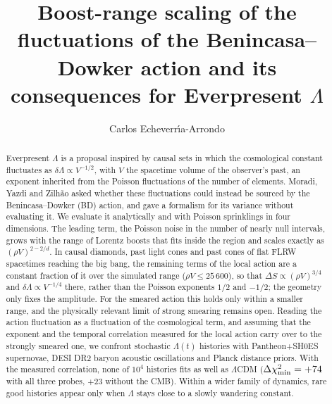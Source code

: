 \documentclass{iopjournal}
\newcommand{\rhoV}{\rho V}
\renewcommand{\articletype}[1]{\noindent{\scriptsize\sf\bfseries\MakeUppercase{#1}}\par\vspace{4mm}}
\begin{document}
\articletype{Paper}

\title{Boost-range scaling of the fluctuations of the Benincasa--Dowker action and its consequences for Everpresent $\Lambda$}

\author{Carlos Echeverr\'{\i}a-Arrondo}




\begin{abstract}
Everpresent $\Lambda$ is a proposal inspired by causal sets in which the
cosmological constant fluctuates as $\delta\Lambda\propto V^{-1/2}$, with $V$
the spacetime volume of the observer's past, an exponent inherited from the
Poisson fluctuations of the number of elements. Moradi, Yazdi and Zilh\~ao
asked whether these fluctuations could instead be sourced by the
Benincasa--Dowker (BD) action, and gave a formalism for its variance without
evaluating it. We evaluate it analytically and with Poisson sprinklings in
four dimensions. The leading term, the Poisson noise in the number of nearly
null intervals, grows with the range of Lorentz boosts that fits inside the
region and scales exactly as $(\rhoV)^{2-2/d}$. In causal diamonds, past
light cones and past cones of flat FLRW spacetimes reaching the big bang, the
remaining terms of the local action are a constant fraction of it over the
simulated range ($\rhoV\le25\,600$), so that $\Delta S\propto(\rhoV)^{3/4}$
and $\delta\Lambda\propto V^{-1/4}$ there, rather than the Poisson exponents
$1/2$ and $-1/2$; the geometry only fixes the amplitude. For the smeared action this holds only
within a smaller range, and the physically relevant limit of strong smearing
remains open. Reading the action fluctuation as a fluctuation of the
cosmological term, and assuming that the exponent and the temporal
correlation measured for the local action carry over to the strongly smeared
one, we confront stochastic $\Lambda(t)$ histories with Pantheon+SH0ES
supernovae, DESI DR2 baryon acoustic oscillations and Planck distance
priors. With the measured correlation, none of $10^4$ histories fits as well
as $\Lambda$CDM ($\Delta\chi^2_{\rm min}=+74$ with all three probes, $+23$
without the CMB).
Within a wider family of dynamics, rare good histories appear only when
$\Lambda$ stays close to a slowly wandering constant.
\end{abstract}
\end{document}
